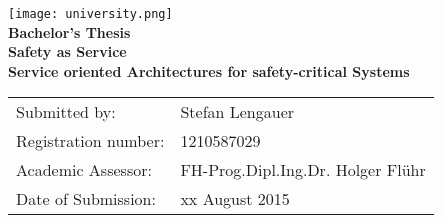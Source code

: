 \begin{titlepage}
	\begin{center}

		\texttt{[image: university.png]}\\
		\vspace*{5cm}
		\LARGE
		\textbf{Bachelor's Thesis}\\
		\vspace{1.5cm}
		\Huge
		\textbf{Safety as Service}\\
		\LARGE
		\textbf{Service oriented Architectures for safety-critical Systems}

		\vfill

		\large
		\begin{tabular}{ll}
			Submitted by:&Stefan Lengauer\\
			Registration number:&1210587029\\
			Academic Assessor:&FH-Prog.Dipl.Ing.Dr. Holger Flühr\\
			Date of Submission:&xx August 2015\\
		\end{tabular}
	\end{center}
\end{titlepage}